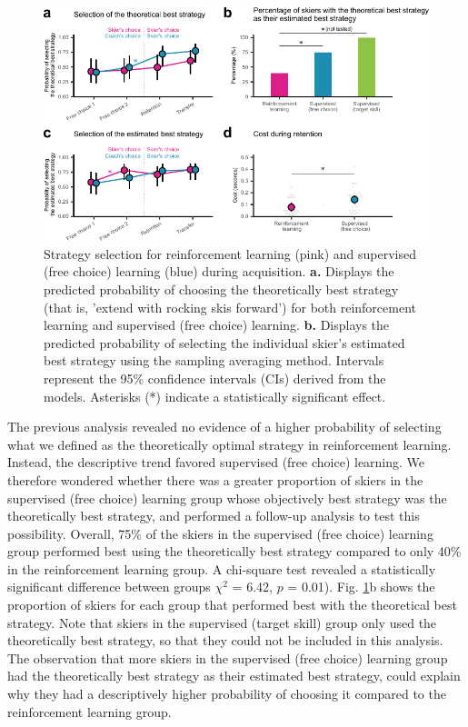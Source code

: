 \documentclass[pdflatex,sn-nature]{sn-jnl}%
\theoremstyle{thmstyleone}%
\theoremstyle{thmstyletwo}%
\theoremstyle{thmstylethree}%
\begin{document}
\begin{figure}[H]
\centering
\includegraphics{figures/figure_choice_estimated_4.pdf}
\caption{Strategy selection for reinforcement learning (pink) and supervised (free choice) learning (blue) during acquisition. \textbf{a.} Displays the predicted probability of choosing the theoretically best strategy (that is, 'extend with rocking skis forward') for both reinforcement learning and supervised (free choice) learning. \textbf{b.} Displays the predicted probability of selecting the individual skier's estimated best strategy using the sampling averaging method\cite{sutton_reinforcement_2018}. Intervals represent the 95\% confidence intervals (CIs) derived from the models. Asterisks (*) indicate a statistically significant effect.}\label{fig: choice_estimated}
\end{figure}

The previous analysis revealed no evidence of a higher probability of selecting what we defined as the theoretically optimal strategy in reinforcement learning. Instead, the descriptive trend favored supervised (free choice) learning. We therefore wondered whether there was a greater proportion of skiers in the supervised (free choice) learning group whose objectively best strategy was the theoretically best strategy, and performed a follow-up analysis to test this possibility. Overall, 75\% of the skiers in the supervised (free choice) learning group performed best using the theoretically best strategy compared to only 40\% in the reinforcement learning group. A chi-square test revealed a statistically significant difference between groups $\chi^2$ = 6.42, $p$ = 0.01). Fig. \ref{fig: choice_estimated}b shows the proportion of skiers for each group that performed best with the theoretical best strategy. Note that skiers in the supervised (target skill) group only used the theoretically best strategy, so that they could not be included in this analysis. The observation that more skiers in the supervised (free choice) learning group had the theoretically best strategy as their estimated best strategy, could explain why they had a descriptively higher probability of choosing it compared to the reinforcement learning group.
\end{document}
